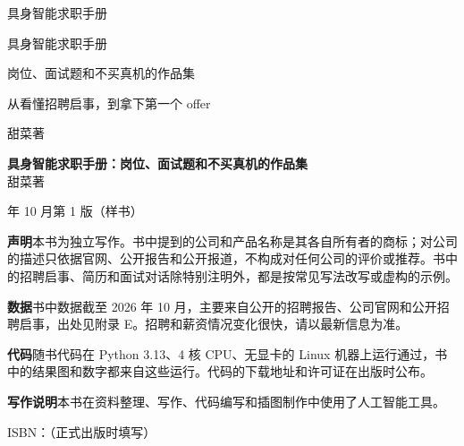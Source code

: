 \thispagestyle{empty}
\vspace*{60mm}
\begin{center}
{\heitiblack\fontsize{30}{36}\selectfont 具身智能求职手册}
\end{center}
\cleardoublepage

\thispagestyle{empty}
\vspace*{38mm}
\begin{center}
{\heitiblack\fontsize{36}{44}\selectfont 具身智能求职手册}\par
\vspace{9mm}
{\heiti\Large 岗位、面试题和不买真机的作品集}\par
\vspace{4mm}
{\heiti\normalsize\color{mid} 从看懂招聘启事，到拿下第一个 offer}\par
\vfill
{\heiti\Large 甜菜\quad 著}\par
\vspace{20mm}
\end{center}
\newpage

\thispagestyle{empty}
\vspace*{\fill}
{\small\setlength{\parskip}{1.2ex}\linespread{1.5}\selectfont
\noindent\textbf{具身智能求职手册：岗位、面试题和不买真机的作品集}\\
甜菜\quad 著

 年 10 月第 1 版（样书）

\noindent\textbf{声明}\quad 本书为独立写作。书中提到的公司和产品名称是其各自所有者的商标；对公司的描述只依据官网、公开报告和公开报道，不构成对任何公司的评价或推荐。书中的招聘启事、简历和面试对话除特别注明外，都是按常见写法改写或虚构的示例。

\noindent\textbf{数据}\quad 书中数据截至 2026 年 10 月，主要来自公开的招聘报告、公司官网和公开招聘启事，出处见附录 E。招聘和薪资情况变化很快，请以最新信息为准。

\noindent\textbf{代码}\quad 随书代码在 Python 3.13、4 核 CPU、无显卡的 Linux 机器上运行通过，书中的结果图和数字都来自这些运行。代码的下载地址和许可证在出版时公布。

\noindent\textbf{写作说明}\quad 本书在资料整理、写作、代码编写和插图制作中使用了人工智能工具。

\noindent ISBN：（正式出版时填写）
\par}
\cleardoublepage
